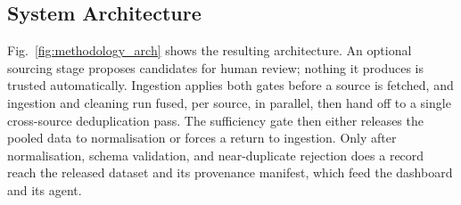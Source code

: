 \documentclass[conference]{IEEEtran}
\begin{document}
\subsection{System Architecture}

Fig.~\ref{fig:methodology_arch} shows the resulting architecture. An
optional sourcing stage proposes candidates for human review; nothing
it produces is trusted automatically. Ingestion applies both gates
before a source is fetched, and ingestion and cleaning run fused, per
source, in parallel, then hand off to a single cross-source
deduplication pass. The sufficiency gate then either releases the pooled data to
normalisation or forces a return to ingestion. Only after
normalisation, schema validation, and near-duplicate rejection does a
record reach the released dataset and its provenance manifest, which
feed the dashboard and its agent.
\end{document}
